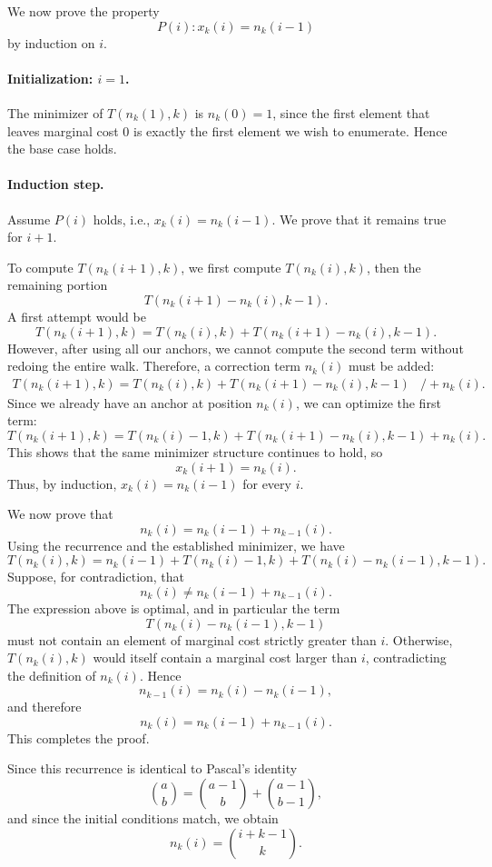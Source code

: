 \documentclass[a4paper,10pt]{article}
\begin{document}
We now prove the property
\[
P(i): x_k(i) = n_k(i-1)
\]
by induction on \(i\).

\paragraph*{Initialization: \(i=1\).}
The minimizer of \(T(n_k(1),k)\) is \(n_k(0)=1\), since the first element that leaves marginal cost \(0\) is exactly the first element we wish to enumerate. Hence the base case holds.

\paragraph*{Induction step.}
Assume \(P(i)\) holds, i.e., \(x_k(i)=n_k(i-1)\). We prove that it remains true for \(i+1\).

To compute \(T(n_k(i+1), k)\), we first compute \(T(n_k(i), k)\), then the remaining portion
\[
T(n_k(i+1)-n_k(i), k-1).
\]
A first attempt would be
\[
T(n_k(i+1), k) = T(n_k(i), k) + T(n_k(i+1)-n_k(i), k-1).
\]
However, after using all our anchors, we cannot compute the second term without redoing the entire walk. Therefore, a correction term \(n_k(i)\) must be added:
\[
\begin{aligned}
T(n_k(i+1), k) = T(n_k(i), k) + T(n_k(i+1)-n_k(i), k-1)&  / + n_k(i).
\end{aligned}
\]
Since we already have an anchor at position \(n_k(i)\), we can optimize the first term:
\[
T(n_k(i+1), k)
  = T(n_k(i)-1, k) + T(n_k(i+1)-n_k(i), k-1) + n_k(i).
\]
This shows that the same minimizer structure continues to hold, so
\[
x_k(i+1) = n_k(i).
\]
Thus, by induction, \(x_k(i) = n_k(i-1)\) for every \(i\).

\bigskip

We now prove that
\[
n_k(i) = n_k(i-1) + n_{k-1}(i).
\]
Using the recurrence and the established minimizer, we have
\[
T(n_k(i), k)
  = n_k(i-1) + T(n_k(i)-1, k) + T(n_k(i)-n_k(i-1), k-1).
\]
Suppose, for contradiction, that
\[
n_k(i) \neq n_k(i-1) + n_{k-1}(i).
\]
The expression above is optimal, and in particular the term
\[
T(n_k(i)-n_k(i-1), k-1)
\]
must not contain an element of marginal cost strictly greater than \(i\). Otherwise, \(T(n_k(i), k)\) would itself contain a marginal cost larger than \(i\), contradicting the definition of \(n_k(i)\). Hence
\[
n_{k-1}(i) = n_k(i) - n_k(i-1),
\]
and therefore
\[
n_k(i) = n_k(i-1) + n_{k-1}(i).
\]
This completes the proof.

Since this recurrence is identical to Pascal's identity \cite{graham1994concrete}
\[
\binom{a}{b} = \binom{a-1}{b} + \binom{a-1}{b-1},
\]
and since the initial conditions match, we obtain
\[
n_k(i) = \binom{i + k - 1}{k}.
\]
\end{document}
